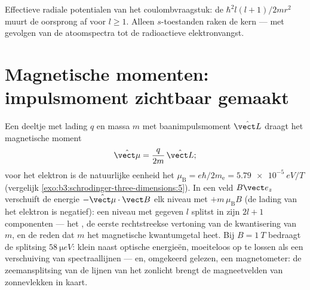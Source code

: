 \begin{omfigure}

{\small Effectieve radiale potentialen van het coulombvraagstuk: de
 $\hbar^2l(l+1)/2mr^2$ muurt de oorsprong af voor $l \ge 1$. Alleen $s$-toestanden raken de kern --- met gevolgen van de
atoomspectra tot de radioactieve elektronvangst.}
\end{omfigure}

\section{Magnetische momenten: impulsmoment zichtbaar gemaakt}

\begin{proposition}\label{prop:b3:quantum-angular-momentum:magnetic}
Een deeltje met lading $q$ en massa $m$ met baanimpulsmoment
$\hat{\vect L}$ draagt het magnetische moment
\[
\hat{\vect\mu} = \frac{q}{2m}\,\hat{\vect L} ;
\]
voor het elektron is de natuurlijke eenheid het \emph{}
$\mu_{\text{B}} = e\hbar/2m_{\text{e}} = \qty{5.79e-5}{eV/T}$
(vergelijk \cref{exo:b3:schrodinger-three-dimensions:5}). In een veld
$B\vect e_z$ verschuift de energie $-\hat{\vect\mu}\cdot\vect B$ elk
niveau met $+m\,\mu_{\text{B}}B$ (de lading van het elektron is
negatief): een niveau met gegeven $l$ splitst in zijn $2l + 1$
componenten --- het \emph{}, de eerste rechtstreekse
vertoning van de kwantisering van $m$, en de reden dat $m$ het
magnetische kwantumgetal heet. Bij $B = \qty{1}{T}$ bedraagt de
splitsing $\qty{58}{\micro eV}$: klein naast optische energieën, moeiteloos
op te lossen als een verschuiving van spectraallijnen --- en, omgekeerd
gelezen, een magnetometer: de zeemansplitsing van de lijnen van het
zonlicht brengt de magneetvelden van zonnevlekken in kaart.
\end{proposition}

